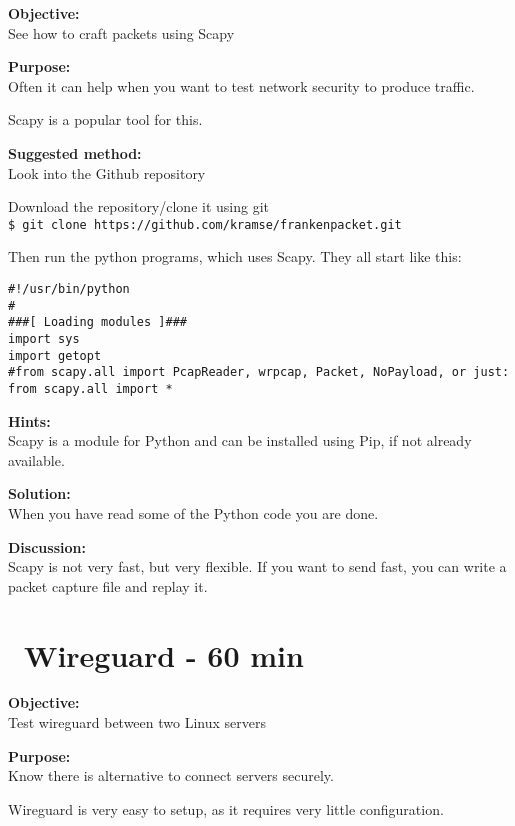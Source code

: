 \documentclass[a4paper,11pt,notitlepage]{report}
\begin{document}
{\bf Objective:}\\
See how to craft packets using Scapy

{\bf Purpose:}\\
Often it can help when you want to test network security to produce traffic.

Scapy is a popular tool for this.\\

{\bf Suggested method:}\\
Look into the Github repository\\

Download the repository/clone it using git\\
\verb+$ git clone https://github.com/kramse/frankenpacket.git+

Then run the python programs, which uses Scapy. They all start like this:

\begin{verbatim}
#!/usr/bin/python
#
###[ Loading modules ]###
import sys
import getopt
#from scapy.all import PcapReader, wrpcap, Packet, NoPayload, or just:
from scapy.all import *
\end{verbatim}

{\bf Hints:}\\
Scapy is a module for Python and can be installed using Pip, if not already available.

{\bf Solution:}\\
When you have read some of the Python code you are done.

{\bf Discussion:}\\
Scapy is not very fast, but very flexible. If you want to send fast, you can write a packet capture file and replay it.



\chapter{\faInfoCircle\ Wireguard - 60 min}
\label{ex:wireguard-setup}

{\bf Objective:}\\
Test wireguard between two Linux servers


{\bf Purpose:}\\
Know there is alternative to connect servers securely.

Wireguard is very easy to setup, as it requires very little configuration.
\end{document}
